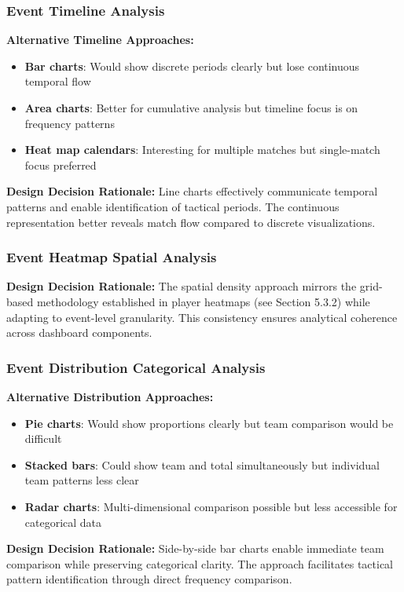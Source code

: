 \documentclass[12pt,a4paper]{article}
\begin{document}
\subsubsection{Event Timeline Analysis}
\textbf{Alternative Timeline Approaches:}
\begin{itemize}
    \item \textbf{Bar charts}: Would show discrete periods clearly but lose continuous temporal flow
    \item \textbf{Area charts}: Better for cumulative analysis but timeline focus is on frequency patterns
    \item \textbf{Heat map calendars}: Interesting for multiple matches but single-match focus preferred
\end{itemize}

\textbf{Design Decision Rationale:}
Line charts effectively communicate temporal patterns and enable identification of tactical periods. The continuous representation better reveals match flow compared to discrete visualizations.

\subsubsection{Event Heatmap Spatial Analysis}
\textbf{Design Decision Rationale:}
The spatial density approach mirrors the grid-based methodology established in player heatmaps (see Section 5.3.2) while adapting to event-level granularity. This consistency ensures analytical coherence across dashboard components.

\subsubsection{Event Distribution Categorical Analysis}
\textbf{Alternative Distribution Approaches:}
\begin{itemize}
    \item \textbf{Pie charts}: Would show proportions clearly but team comparison would be difficult
    \item \textbf{Stacked bars}: Could show team and total simultaneously but individual team patterns less clear
    \item \textbf{Radar charts}: Multi-dimensional comparison possible but less accessible for categorical data
\end{itemize}

\textbf{Design Decision Rationale:}
Side-by-side bar charts enable immediate team comparison while preserving categorical clarity. The approach facilitates tactical pattern identification through direct frequency comparison.
\end{document}
